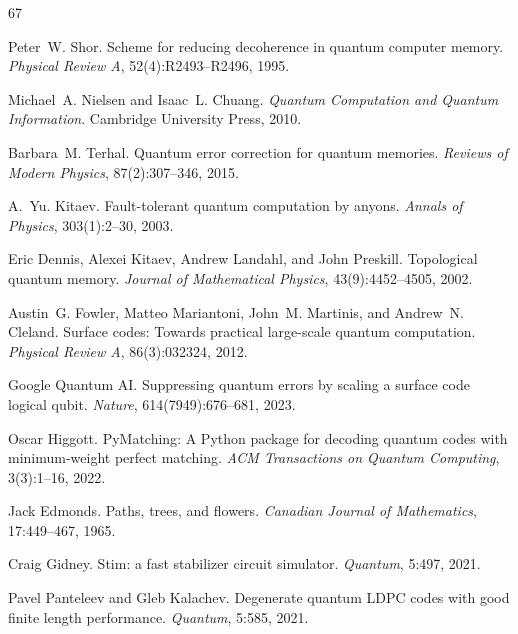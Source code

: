 \documentclass[aps,prxquantum,twocolumn,superscriptaddress,nofootinbib,longbibliography]{revtex4-2}
\begin{document}
\begin{thebibliography}{67}
\providecommand{\natexlab}[1]{#1}
\providecommand{\doi}[1]{doi: #1}

Peter~W. Shor. Scheme for reducing decoherence in quantum computer memory.
\newblock \emph{Physical Review A}, 52(4):R2493--R2496, 1995.

Michael~A. Nielsen and Isaac~L. Chuang. \emph{Quantum Computation and Quantum
Information}. Cambridge University Press, 2010.

Barbara~M. Terhal. Quantum error correction for quantum memories.
\newblock \emph{Reviews of Modern Physics}, 87(2):307--346, 2015.

A.~Yu. Kitaev. Fault-tolerant quantum computation by anyons.
\newblock \emph{Annals of Physics}, 303(1):2--30, 2003.

Eric Dennis, Alexei Kitaev, Andrew Landahl, and John Preskill. Topological
quantum memory. \emph{Journal of Mathematical Physics}, 43(9):4452--4505, 2002.

Austin~G. Fowler, Matteo Mariantoni, John~M. Martinis, and Andrew~N. Cleland.
Surface codes: Towards practical large-scale quantum computation.
\newblock \emph{Physical Review A}, 86(3):032324, 2012.

{Google Quantum AI}. Suppressing quantum errors by scaling a surface code
logical qubit. \emph{Nature}, 614(7949):676--681, 2023.

Oscar Higgott. {PyMatching}: A {Python} package for decoding quantum codes with
minimum-weight perfect matching. \emph{ACM Transactions on Quantum Computing},
3(3):1--16, 2022.

Jack Edmonds. Paths, trees, and flowers. \emph{Canadian Journal of Mathematics},
17:449--467, 1965.

Craig Gidney. Stim: a fast stabilizer circuit simulator. \emph{Quantum}, 5:497,
2021.

Pavel Panteleev and Gleb Kalachev. Degenerate quantum {LDPC} codes with good
finite length performance. \emph{Quantum}, 5:585, 2021.


\end{thebibliography}
\end{document}
